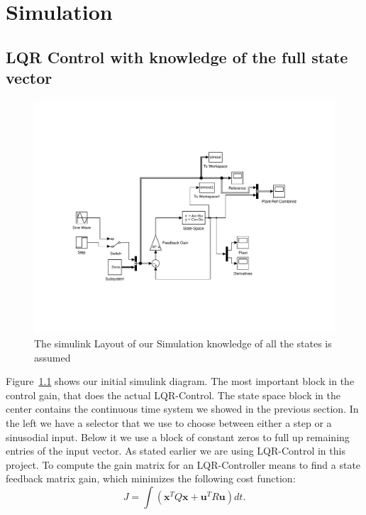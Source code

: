 \documentclass[ twoside,openright,titlepage,numbers=noenddot,headinclude,%
                footinclude=true,cleardoublepage=empty,abstractoff, %
                BCOR=5mm,paper=a4,fontsize=11pt,%
                ngerman,american,%
                ]{scrreprt}
\begin{document}
\chapter{Simulation}
\section{LQR Control with knowledge of the full state vector}
\begin{figure}
\includegraphics[scale=0.5]{images/simModelFullState.pdf}
\caption{The simulink Layout of our Simulation knowledge of all the states is assumed}
\label{fig:allStates}
\end{figure}
Figure~\ref{fig:allStates} shows our initial simulink diagram. The most important block in the control gain, that does the actual LQR-Control. The state space block in the center contains the continuous time system we showed in the previous section. In the left we have a selector that we use to choose between either a step or a sinusodial input. Below it we use a block of constant zeros to full up remaining entries of the input vector. 
As stated earlier we are using LQR-Control in this project. To compute the gain matrix for an LQR-Controller means to find a state feedback matrix gain, which minimizes the following cost function:
\begin{equation}
J = \int(\mathbf{x}^T Q \mathbf{x} + \mathbf{u}^T R \mathbf{u})dt.
\end{equation}
\end{document}
